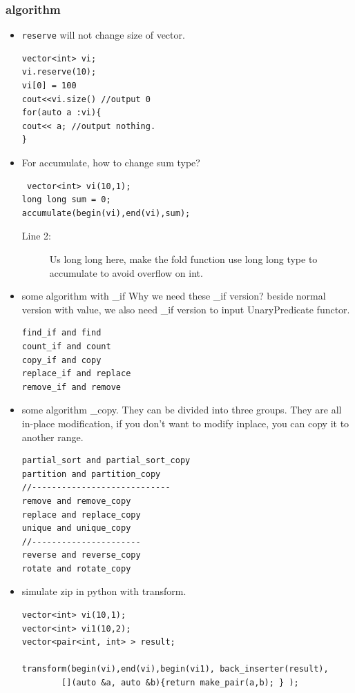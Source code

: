 \documentclass[a4paper,11pt,twoside]{book}
\begin{document}
\subsubsection{algorithm}
\begin{itemize}
\item \texttt{reserve} will not change size of vector. 
\begin{lstlisting}
vector<int> vi;
vi.reserve(10);
vi[0] = 100
cout<<vi.size() //output 0
for(auto a :vi){
cout<< a; //output nothing.
}
\end{lstlisting}

\item For accumulate, how to change sum type?
\begin{lstlisting}
 vector<int> vi(10,1);
long long sum = 0;
accumulate(begin(vi),end(vi),sum);
\end{lstlisting}
\begin{description}
\item[Line 2:] Us long long here, make the fold function use long long type to accumulate to avoid overflow on int.
\end{description}

\item some algorithm with \_if  Why we need these \_if version? beside normal version with value, we also need \_if version to input UnaryPredicate functor. 
\begin{lstlisting}
find_if and find
count_if and count
copy_if and copy
replace_if and replace
remove_if and remove
\end{lstlisting}

\item some algorithm \_copy. They can be divided into three groups. They are all in-place modification, if you don't want to modify inplace, you can copy it to another range.
\begin{lstlisting}
partial_sort and partial_sort_copy
partition and partition_copy
//----------------------------
remove and remove_copy
replace and replace_copy
unique and unique_copy
//----------------------
reverse and reverse_copy
rotate and rotate_copy
\end{lstlisting}

\item simulate zip in python with transform.
\begin{lstlisting}
vector<int> vi(10,1);
vector<int> vi1(10,2);
vector<pair<int, int> > result;

transform(begin(vi),end(vi),begin(vi1), back_inserter(result),
        [](auto &a, auto &b){return make_pair(a,b); } );
      

\end{lstlisting}
\end{itemize}
\end{document}
